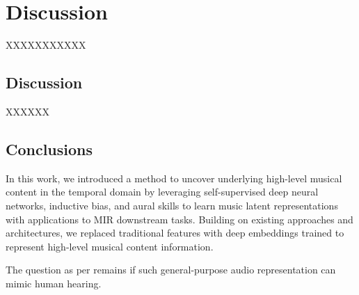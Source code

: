 \chapter{Discussion}

XXXXXXXXXXX

\section{Discussion}

XXXXXX

\section{Conclusions}

In this work, we introduced a method to uncover underlying high-level musical
content in the temporal domain by leveraging self-supervised deep neural networks, inductive bias, and aural skills to learn music latent representations with applications to MIR downstream tasks. Building on existing approaches and architectures, we replaced traditional features with deep embeddings trained to represent high-level musical content information.

The question as per \cite{Turian2022HEAR:Representations} remains if such general-purpose audio representation can mimic human hearing.

\newpage


